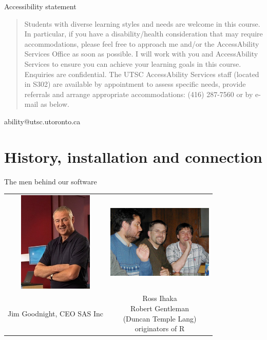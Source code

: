 \documentclass[unknownkeysallowed]{beamer}\usepackage[]{graphicx}\usepackage[]{color}
\begin{document}
\begin{frame}[fragile]{Accessibility statement}

  \begin{quote}
   Students with diverse learning styles and needs are welcome in this
course. In particular, if you have a disability/health consideration
that may require accommodations, please feel free to approach me
and/or the AccessAbility Services Office as soon as possible. I will
work with you and AccessAbility Services to ensure you can achieve
your learning goals in this course. Enquiries are confidential. The
UTSC AccessAbility Services staff (located in S302) are available by
appointment to assess specific needs, provide referrals and arrange
appropriate accommodations: (416) 287-7560 or by e-mail as below.
  \end{quote}

  \begin{semiverbatim}
    ability@utsc.utoronto.ca
  \end{semiverbatim}
  
\end{frame}


\section{History, installation and connection}

\frame{\sectionpage}




\begin{frame}{The men behind our software}

  \begin{tabular}{cc}
    \includegraphics[width=1.4in]{goodnight}
    & \includegraphics[width=2in]{ihaka} \\
    Jim Goodnight, CEO SAS Inc & \pbox{10cm}{Ross Ihaka\\ Robert Gentleman\\ (Duncan
    Temple Lang)\\ originators of R}
  \end{tabular}
  
\end{frame}
\end{document}
